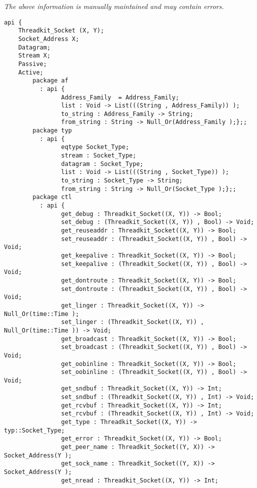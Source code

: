 \label{api:Synchronous\_Socket}

{\tiny \it The above information is manually maintained and may contain errors.}
\begin{verbatim}
api {
    Threadkit_Socket (X, Y);
    Socket_Address X;
    Datagram;
    Stream X;
    Passive;
    Active;
        package af
          : api {
                Address_Family  = Address_Family;
                list : Void -> List(((String , Address_Family)) );
                to_string : Address_Family -> String;
                from_string : String -> Null_Or(Address_Family );};;
        package typ
          : api {
                eqtype Socket_Type;
                stream : Socket_Type;
                datagram : Socket_Type;
                list : Void -> List(((String , Socket_Type)) );
                to_string : Socket_Type -> String;
                from_string : String -> Null_Or(Socket_Type );};;
        package ctl
          : api {
                get_debug : Threadkit_Socket((X, Y)) -> Bool;
                set_debug : (Threadkit_Socket((X, Y)) , Bool) -> Void;
                get_reuseaddr : Threadkit_Socket((X, Y)) -> Bool;
                set_reuseaddr : (Threadkit_Socket((X, Y)) , Bool) -> Void;
                get_keepalive : Threadkit_Socket((X, Y)) -> Bool;
                set_keepalive : (Threadkit_Socket((X, Y)) , Bool) -> Void;
                get_dontroute : Threadkit_Socket((X, Y)) -> Bool;
                set_dontroute : (Threadkit_Socket((X, Y)) , Bool) -> Void;
                get_linger : Threadkit_Socket((X, Y)) -> Null_Or(time::Time );
                set_linger : (Threadkit_Socket((X, Y)) , Null_Or(time::Time )) -> Void;
                get_broadcast : Threadkit_Socket((X, Y)) -> Bool;
                set_broadcast : (Threadkit_Socket((X, Y)) , Bool) -> Void;
                get_oobinline : Threadkit_Socket((X, Y)) -> Bool;
                set_oobinline : (Threadkit_Socket((X, Y)) , Bool) -> Void;
                get_sndbuf : Threadkit_Socket((X, Y)) -> Int;
                set_sndbuf : (Threadkit_Socket((X, Y)) , Int) -> Void;
                get_rcvbuf : Threadkit_Socket((X, Y)) -> Int;
                set_rcvbuf : (Threadkit_Socket((X, Y)) , Int) -> Void;
                get_type : Threadkit_Socket((X, Y)) -> typ::Socket_Type;
                get_error : Threadkit_Socket((X, Y)) -> Bool;
                get_peer_name : Threadkit_Socket((Y, X)) -> Socket_Address(Y );
                get_sock_name : Threadkit_Socket((Y, X)) -> Socket_Address(Y );
                get_nread : Threadkit_Socket((X, Y)) -> Int;

\end{verbatim}
